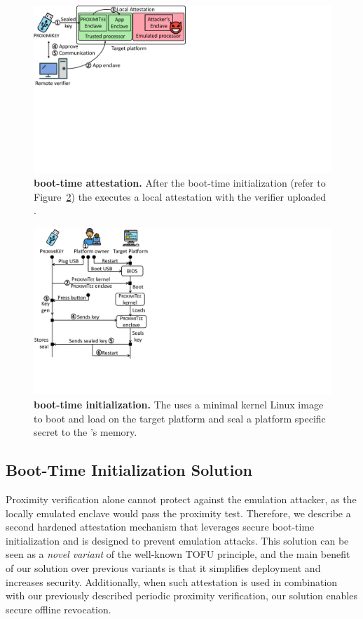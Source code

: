 \begin{figure}[t]
 \centering
\includegraphics[trim={0 9cm 16.5cm 0},clip,width=0.72\linewidth]{chapters/ProximiTEE/images_new/boot_attest.pdf}
 \caption[\name boot-time attestation]{\textbf{\name boot-time attestation.} After the boot-time initialization (refer to Figure~\ref{fig:boot-init}) the \nameclave executes a local attestation with the verifier uploaded \app. 
 }
 \label{fig:boot-attest}
\end{figure}


\begin{figure}[t]
 \centering
    \includegraphics[trim={0 2cm 19cm 0},clip,width=0.7\linewidth]{chapters/ProximiTEE/images_new/boot_init.pdf}
 \caption[\name noot-time initialization]{\textbf{\name boot-time initialization.} The \device uses a minimal kernel Linux image to boot and load \nameclave on the target platform and seal a platform specific secret to the \device{}'s memory.}
 \label{fig:boot-init}
\end{figure}



\subsection{Boot-Time Initialization Solution}

Proximity verification alone cannot protect against the emulation attacker, as the locally emulated enclave would pass the proximity test. 
%
Therefore, we describe a second hardened attestation mechanism that leverages secure boot-time initialization and is designed to prevent emulation attacks. This solution can be seen as a \emph{novel variant} of the well-known TOFU principle, and the main benefit of our solution over previous variants is that it simplifies deployment and increases security. Additionally, when such attestation is used in combination with our previously described periodic proximity verification, our solution enables secure offline revocation.


